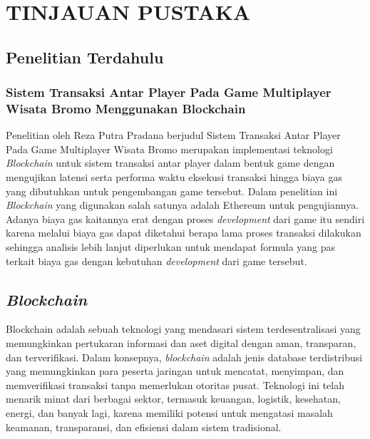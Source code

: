 \chapter{TINJAUAN PUSTAKA}
\label{chap:tinjauanpustaka}


\section{Penelitian Terdahulu}
\label{sec:penelitianterdahulu}

\subsection{Sistem Transaksi Antar Player Pada Game Multiplayer Wisata Bromo Menggunakan Blockchain}
\label{subsec:sistemtransaksiblockchainreza}
Penelitian oleh Reza Putra Pradana berjudul Sistem Transaksi Antar Player Pada Game Multiplayer Wisata
Bromo merupakan implementasi teknologi \emph{Blockchain} untuk sistem transaksi antar player dalam bentuk game
dengan mengujikan latensi serta performa waktu eksekusi transaksi hingga biaya gas yang dibutuhkan untuk
pengembangan game tersebut. Dalam penelitian ini \emph{Blockchain} yang digunakan salah satunya adalah Ethereum untuk pengujiannya.
Adanya biaya gas kaitannya erat dengan proses \emph{development} dari game itu sendiri karena melalui biaya gas
dapat diketahui berapa lama proses transaksi dilakukan sehingga analisis lebih lanjut diperlukan untuk mendapat formula yang pas terkait biaya gas dengan kebutuhan \emph{development} dari game tersebut.

\section{\emph{Blockchain}}
\label{sec:blockchain}
Blockchain adalah sebuah teknologi yang mendasari sistem terdesentralisasi yang memungkinkan pertukaran informasi dan aset digital dengan aman, transparan, dan terverifikasi.
Dalam konsepnya, \emph{blockchain} adalah jenis database terdistribusi yang memungkinkan para peserta jaringan untuk mencatat, menyimpan, dan memverifikasi transaksi tanpa memerlukan otoritas pusat.
Teknologi ini telah menarik minat dari berbagai sektor, termasuk keuangan, logistik, kesehatan, energi, dan banyak lagi, karena memiliki potensi untuk mengatasi masalah keamanan, transparansi,
dan efisiensi dalam sistem tradisional. \parencite{nakamoto2008bitcoin}

